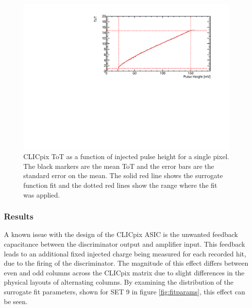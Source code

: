 \begin{figure}
\centering
\includegraphics[width=1.0\textwidth]{CLICdpVertex/Plots/TestPulseCalibration/Fits/Set9/ToT_PulseHeight_Set_9_ChipID_001ec0db94b1_Pixel_x0_y0_Fit.pdf}
\caption[CLICpix ToT as a function of injected pulse height.]{CLICpix ToT as a function of injected pulse height for a single pixel.  The black markers are the mean ToT and the error bars are the standard error on the mean.  The solid red line shows the surrogate function fit and the dotted red lines show the range where the fit was applied.}
\label{fig:testpulseexamplefit}
\end{figure}


\subsubsection{Results}
\label{sec:testpulsecalibrationresults}
A known issue with the design of the CLICpix ASIC is the unwanted feedback capacitance between the discriminator output and amplifier input.  This feedback leads to an additional fixed injected charge being measured for each recorded hit, due to the firing of the discriminator.  The magnitude of this effect differs between even and odd columns across the CLICpix matrix due to slight differences in the physical layouts of alternating columns.  By examining the distribution of the surrogate fit parameters, shown for SET 9 in figure \ref{fig:fitparams}, this effect can be seen.  

